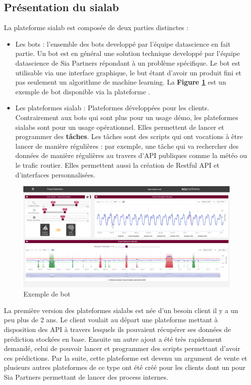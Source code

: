 \documentclass{article} %
\begin{document}
\subsection{Présentation du sialab}
La plateforme sialab est composée de deux parties distinctes :
\begin{itemize}
	\item Les bots : l'ensemble des bots developpé par l'équipe datascience en fait partie. Un bot est en général une solution technique developpé par l'équipe datascience de Sia Partners répondant à un problème spécifique. Le bot est utilisable via une interface graphique, le but étant d'avoir un produit fini et pas seulement un algorithme de machine learning. La \textbf{Figure \ref{fig:bot}} est un exemple de bot disponible via la plateforme \cite{bot}.
	\item Les plateformes sialab : Plateformes développées pour les clients. Contrairement aux bots qui sont plus pour un usage démo, les plateformes sialabs sont pour un usage opérationnel. Elles permettent de lancer et programmer des \textbf{tâches}. Les tâches sont des scripts qui ont vocations à être lancer de manière régulières : par exemple, une tâche qui va rechercher des données de manière régulières au travers d'API publiques comme la météo ou le trafic routier. Elles permettent aussi la création de Restful API et d'interfaces personnalisées.
\end{itemize}

\begin{figure}[!h]
	\centering
	\includegraphics[keepaspectratio = true,scale=0.25]{bot.png}
	\caption{Exemple de bot}
	\label{fig:bot}
\end{figure}

La première version des plateformes sialabs est née d'un besoin client il y a un peu plus de 2 ans. Le client voulait au départ une plateforme mettant à disposition des API à travers lesquels ils pouvaient récupérer ses données de prédiction stockées en base. Ensuite un autre ajout a été très rapidement demandé, celui de pouvoir lancer et programmer des scripts permettant d'avoir ces prédictions. Par la suite, cette plateforme est devenu un argument de vente et plusieurs autres plateformes de ce type ont été créé pour les clients dont un pour Sia Partners permettant de lancer des process internes.\\
\end{document}
